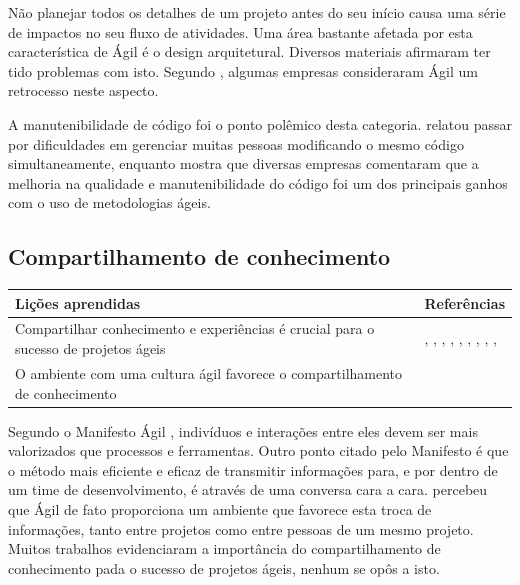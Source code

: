 Não planejar todos os detalhes de um projeto antes do seu início causa uma série de impactos no seu fluxo de atividades. Uma área bastante afetada por esta característica de Ágil é o design arquitetural. Diversos materiais afirmaram ter tido problemas com isto. Segundo \cite{Bustard2013}, algumas empresas consideraram Ágil um retrocesso neste aspecto.

A manutenibilidade de código foi o ponto polêmico desta categoria. \cite{Nokia2013} relatou passar por dificuldades em gerenciar muitas pessoas modificando o mesmo código simultaneamente, enquanto \cite{Bustard2013} mostra que diversas empresas comentaram que a melhoria na qualidade e manutenibilidade do código foi um dos principais ganhos com o uso de metodologias ágeis.

\subsection{Compartilhamento de conhecimento}

\begin{table}[H]
	\centering
	\begin{tabularx}{\linewidth}{ | X | p{5cm} | } \hline \textbf{Lições aprendidas} & \textbf{Referências} \\ \hline
		Compartilhar conhecimento e experiências é crucial para o sucesso de projetos ágeis & \cite{Asnawi2012}, \cite{Cisco2011}, \cite{Lapham2012}, \cite{Radha2012}, \cite{Eunha2012}, \cite{Valerio2013}, \cite{Vieira2013}, \cite{Queiroz2013}, \cite{Bastos2013}, \cite{Maciel2013} \\ \hline
		O ambiente com uma cultura ágil favorece o compartilhamento de conhecimento & \cite{Ericsson2013} \\ \hline
	\end{tabularx}
\end{table}

Segundo o Manifesto Ágil \cite{agileManifesto}, indivíduos e interações entre eles devem ser mais valorizados que processos e ferramentas. Outro ponto citado pelo Manifesto é que o método mais eficiente e eficaz de transmitir informações para, e por dentro de um time de desenvolvimento, é através de uma conversa cara a cara. \cite{Ericsson2013} percebeu que Ágil de fato proporciona um ambiente que favorece esta troca de informações, tanto entre projetos como entre pessoas de um mesmo projeto. Muitos trabalhos evidenciaram a importância do compartilhamento de conhecimento pada o sucesso de projetos ágeis, nenhum se opôs a isto.

